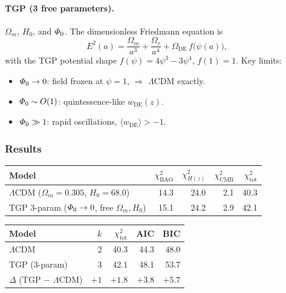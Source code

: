\paragraph{TGP (3 free parameters).}
$\Omega_{m}$, $H_{0}$, and $\varPhi_0$.
The dimensionless Friedmann equation is
\begin{equation}\label{eq:E2}
  E^{2}(a)
  = \frac{\Omega_{m}}{a^{3}} + \frac{\Omega_{r}}{a^{4}}
  + \Omega_{\mathrm{DE}}\,f\bigl(\psi(a)\bigr),
\end{equation}
with the TGP potential shape $f(\psi)=4\psi^{3}-3\psi^{4}$,
$f(1)=1$.  Key limits:
\begin{itemize}[nosep]
  \item $\varPhi_0\to 0$: field frozen at $\psi=1$,
        $\Rightarrow$ $\Lambda$CDM exactly.
  \item $\varPhi_0\sim O(1)$: quintessence-like $w_{\mathrm{DE}}(z)$.
  \item $\varPhi_0\gg 1$: rapid oscillations,
        $\langle w_{\mathrm{DE}}\rangle > -1$.
\end{itemize}

\subsubsection{Results}

\begin{center}\small
\begin{tabular}{@{}lrrrr@{}}
\toprule
\textbf{Model} & $\chi^{2}_{\mathrm{BAO}}$ & $\chi^{2}_{H(z)}$ &
$\chi^{2}_{\mathrm{CMB}}$ & $\chi^{2}_{\mathrm{tot}}$ \\
\midrule
$\Lambda$CDM ($\Omega_{m}=0.305$, $H_{0}=68.0$)
  & 14.3 & 24.0 & 2.1 & 40.3 \\
TGP 3-param ($\varPhi_0\to 0$, free $\Omega_{m},H_{0}$)
  & 15.1 & 24.2 & 2.9 & 42.1 \\
\bottomrule
\end{tabular}
\end{center}

\begin{center}\small
\begin{tabular}{@{}lrrrr@{}}
\toprule
\textbf{Model} & $k$ & $\chi^{2}_{\mathrm{tot}}$ & AIC & BIC \\
\midrule
$\Lambda$CDM & 2 & 40.3 & 44.3 & 48.0 \\
TGP (3-param) & 3 & 42.1 & 48.1 & 53.7 \\
\midrule
$\Delta$ (TGP $-$ $\Lambda$CDM) & $+1$ & $+1.8$ & $+3.8$ & $+5.7$ \\
\bottomrule
\end{tabular}
\end{center}

